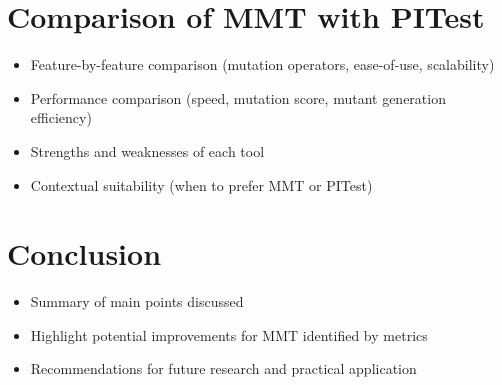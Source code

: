 \documentclass[sigplan, nonacm]{acmart}
\begin{document}
\section{Comparison of MMT with PITest}
\begin{itemize}
    \item Feature-by-feature comparison (mutation operators, ease-of-use, scalability)
    \item Performance comparison (speed, mutation score, mutant generation efficiency)
    \item Strengths and weaknesses of each tool
    \item Contextual suitability (when to prefer MMT or PITest)
\end{itemize}

\section{Conclusion}
\begin{itemize}
    \item Summary of main points discussed
    \item Highlight potential improvements for MMT identified by metrics
    \item Recommendations for future research and practical application
\end{itemize}



\end{document}
